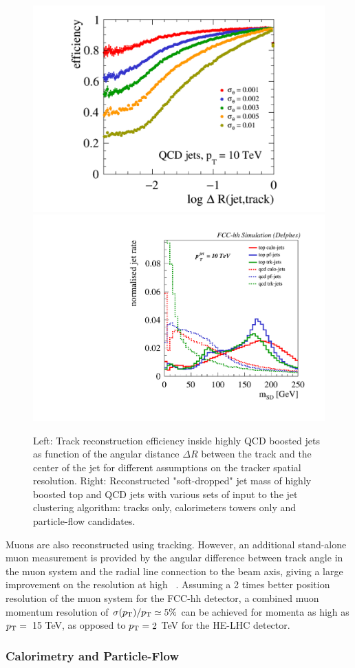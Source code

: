 \begin{figure}[htb!]
  \centering
  \includegraphics[width=0.56\columnwidth]{Fig/dtf.pdf}
  \includegraphics[width=0.42\columnwidth]{Fig/jetalgo.pdf}
  \caption{Left: Track reconstruction efficiency inside highly QCD boosted jets as function of the angular distance $\Delta R$ between the track and the center of the jet for different assumptions on the tracker spatial resolution. Right: Reconstructed 
  "soft-dropped" jet mass of highly boosted top and QCD jets with various sets of input to the jet clustering algorithm: tracks only, calorimeters towers only and particle-flow candidates. }
  \label{fig:substructure}
\end{figure}

Muons are also reconstructed using tracking. However, an additional stand-alone muon measurement is provided by the angular difference between track angle in the muon system and the radial line connection to the beam axis, giving a large improvement on the resolution at high \pt~\cite{cdr_volume3}. Assuming a 2 times better position resolution of the muon system for the FCC-hh detector, a combined muon momentum resolution of $\sigma(p_{\text{T}})/p_{\text{T}}  \simeq 5\%$ can be achieved for momenta as high as $p_{\text{T}}=$~15 TeV, as opposed to $p_{\text{T}}=2~$TeV for the HE-LHC detector.





\subsubsection{Calorimetry and Particle-Flow}
\label{appsub:calorimetry}

